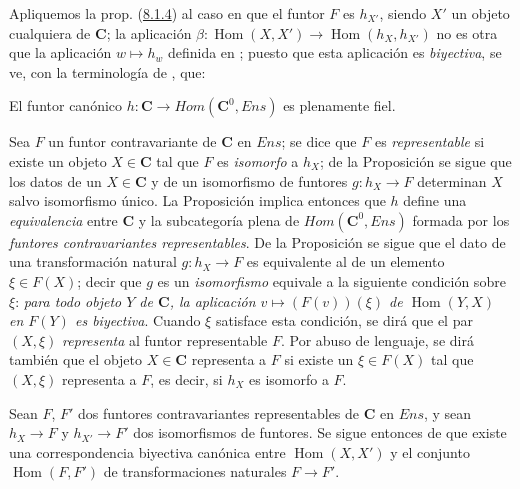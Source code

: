 \begin{env}[8.1.6]
\label{0.8.1.6-fr}
Apliquemos la prop. (\hyperref[0.8.1.4-fr]{8.1.4}) al caso en que el funtor $F$ es $h_{X'}$, siendo $X'$ un
objeto cualquiera de $\boldsymbol{C}$; la aplicación $\beta:\operatorname{Hom}(X,X')\to\operatorname{Hom}(h_X,h_{X'})$ no es otra que la aplicación
$w\mapsto h_w$ definida en ; puesto que esta aplicación es \emph{biyectiva}, se ve,
con la terminología de , que:
\end{env}

\begin{proposition}[8.1.7]
\label{0.8.1.7}
\label{0.8.1.7-fr}
El funtor canónico $h:\boldsymbol{C}\to\boldsymbol{\mathit{Hom}}(\boldsymbol{C}^0,\boldsymbol{\mathit{Ens}})$ es plenamente fiel.
\end{proposition}

\begin{env}[8.1.8]
\label{0.8.1.8}
\label{0.8.1.8-fr}
Sea $F$ un funtor contravariante de $\boldsymbol{C}$ en $\boldsymbol{\mathit{Ens}}$; se dice que $F$ es \emph{representable} si
existe un objeto $X\in\boldsymbol{C}$ tal que $F$ es \emph{isomorfo} a $h_X$; de la
Proposición  se sigue que los datos de un $X\in\boldsymbol{C}$ y de un isomorfismo de funtores
$g:h_X\to F$ determinan $X$ salvo isomorfismo único. La Proposición  implica entonces
que $h$ define una \emph{equivalencia} entre $\boldsymbol{C}$ y la subcategoría plena de
$\boldsymbol{\mathit{Hom}}(\boldsymbol{C}^0,\boldsymbol{\mathit{Ens}})$ formada por los \emph{funtores contravariantes representables}. De la
Proposición  se sigue que el dato de una transformación natural $g:h_X\to F$ es
equivalente al de un elemento $\xi\in F(X)$; decir que $g$ es un \emph{isomorfismo} equivale
a la siguiente condición sobre $\xi$: \emph{para todo objeto $Y$ de $\boldsymbol{C}$, la aplicación
$v\mapsto(F(v))(\xi)$ de $\operatorname{Hom}(Y,X)$ en $F(Y)$ es biyectiva}. Cuando $\xi$ satisface esta condición, se dirá que el par $(X,\xi)$ \emph{representa} al funtor representable $F$. Por abuso de lenguaje, se dirá también que el objeto $X\in\boldsymbol{C}$ representa a $F$ si existe un $\xi\in F(X)$ tal que
$(X,\xi)$ representa a $F$, es decir, si $h_X$ es isomorfo a $F$.

Sean $F$, $F'$ dos funtores contravariantes representables de $\boldsymbol{C}$ en $\boldsymbol{\mathit{Ens}}$, y sean $h_X\to F$ y
$h_{X'}\to F'$ dos isomorfismos de funtores. Se sigue entonces de  que
existe una correspondencia biyectiva canónica entre $\operatorname{Hom}(X,X')$ y el conjunto $\operatorname{Hom}(F,F')$ de
transformaciones naturales $F\to F'$.
\end{env}


